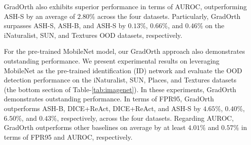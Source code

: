 \documentclass{article}
\begin{document}
GradOrth also exhibits superior performance in terms of AUROC, outperforming ASH-S by an average of $2.80\%$ across the four datasets. Particularly, GradOrth surpasses ASH-S, ASH-B, and ASH-S by $0.13\%$, $0.66\%$, and $0.46\%$ on the iNaturalist, SUN, and Textures OOD datasets, respectively.

For the pre-trained MobileNet model, our GradOrth approach also demonstrates outstanding performance. We present experimental results on leveraging MobileNet as the pre-trained identification (ID) network and evaluate the OOD detection performance on the iNaturalist, SUN, Places, and Textures datasets (the bottom section of Table-\ref{tab:imagenet}). In these experiments, GradOrth demonstrates outstanding performance. In terms of FPR95, GradOrth outperforms ASH-B, DICE+ReAct, DICE+ReAct, and ASH-S by $4.65\%$, $0.40\%$, $6.50\%$, and $0.43\%$, respectively, across the four datasets. Regarding AUROC, GradOrth outperforms other baselines on average by at least $4.01\%$ and $0.57\%$ in terms of FPR95 and AUROC, respectively.
\end{document}
